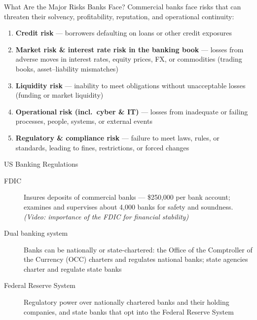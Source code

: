 \documentclass[aspectratio=169]{beamer}
\begin{document}
\begin{frame}{What Are the Major Risks Banks Face?}
Commercial banks face risks that can threaten their solvency, profitability, reputation, and operational continuity:
\begin{enumerate}
  \item \textbf{Credit risk} --- borrowers defaulting on loans or other credit exposures
  \item \textbf{Market risk \& interest rate risk in the banking book} --- losses from adverse moves in interest rates, equity prices, FX, or commodities (trading books, asset--liability mismatches)
  \item \textbf{Liquidity risk} --- inability to meet obligations without unacceptable losses (funding or market liquidity)
  \item \textbf{Operational risk (incl.\ cyber \& IT)} --- losses from inadequate or failing processes, people, systems, or external events
  \item \textbf{Regulatory \& compliance risk} --- failure to meet laws, rules, or standards, leading to fines, restrictions, or forced changes
\end{enumerate}
\end{frame}

\begin{frame}{US Banking Regulations}
\begin{description}
  \item[FDIC] Insures deposits of commercial banks --- \$250{,}000 per bank account; examines and supervises about 4{,}000 banks for safety and soundness. \emph{(Video: importance of the FDIC for financial stability)}
  \item[Dual banking system] Banks can be nationally or state-chartered: the Office of the Comptroller of the Currency (OCC) charters and regulates national banks; state agencies charter and regulate state banks
  \item[Federal Reserve System] Regulatory power over nationally chartered banks and their holding companies, and state banks that opt into the Federal Reserve System
\end{description}
\end{frame}
\end{document}
